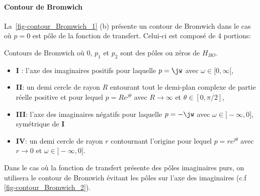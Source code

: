 \paragraph{Contour de Bromwich}
La~\cref{fig-contour_Bromwich_1} (b) présente un contour de Bromwich dans le 
cas où $p=0$ est pôle de la fonction de transfert. Celui-ci est composé de 4 portions:
%    
\begin{marginfigure}
    \centering
    
    \caption{Contours de Bromwich où 0, $p_1$ et $p_2$ sont des pôles
             ou zéros de $H_{BO}$.\label{fig-contour_Bromwich_2}} 
\end{marginfigure}
\begin{itemize}
    \item \textbf{I} : l'axe des imaginaires positifs pour laquelle 
          $p=\jw$ avec $\omega\in[0,\infty[$,
    \item \textbf{II}: un demi cercle de rayon $R$ entourant tout le demi-plan 
          complexe de partie réelle positive 
          et pour lequel $p=Re^{j\theta}$ avec $R\rightarrow\infty$ et 
          $\theta\in[0,\pi/2]$,
    \item \textbf{III}: l'axe des imaginaires négatifs  pour laquelle $p=-\jw$ 
          avec $\omega\in]-\infty,0]$, symétrique de \textbf{I}
    \item \textbf{IV}:  un demi cercle de rayon $r$ contournant l'origine 
          pour lequel $p=re^{j\theta}$ avec $r\rightarrow0$ et 
          $\omega\in]-\infty,0]$.
\end{itemize}
Dans le cas où la fonction de transfert présente des pôles imaginaires purs,
on utilisera le contour de Bromwich évitant les pôles sur l'axe des imaginaires 
(c.f \cref{fig-contour_Bromwich_2}).
